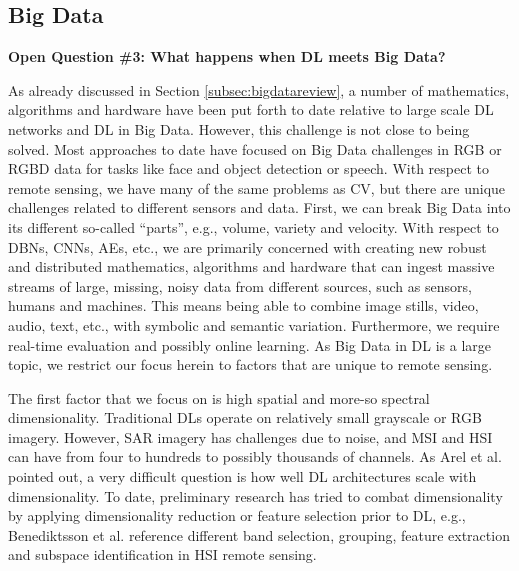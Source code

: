 \documentclass[12pt]{spieman}
\begin{document}
\begin{spacing}{1}
%
%
\subsection{Big Data}
\label{subsec:ChallengesOpportunities_iii}
\textbf{Open Question \#3: What happens when DL meets Big Data?}

As already discussed in Section \ref{subsec:bigdatareview}, a number of mathematics, algorithms and hardware have been put forth to date relative to large scale DL networks and DL in Big Data. However, this challenge is not close to being solved. Most approaches to date have focused on Big Data challenges in RGB or RGBD data for tasks like face and object detection or speech. With respect to remote sensing, we have many of the same problems as CV, but there are unique challenges related to different sensors and data. First, we can break Big Data into its different so-called ``parts'', e.g., volume, variety and velocity. With respect to DBNs, CNNs, AEs, etc., we are primarily concerned with creating new robust and distributed mathematics, algorithms and hardware that can ingest massive streams of large, missing, noisy data from different sources, such as sensors, humans and machines. This means being able to combine image stills, video, audio, text, etc., with symbolic and semantic variation. Furthermore, we require real-time evaluation and possibly online learning. As Big Data in DL is a large topic, we restrict our focus herein to factors that are unique to remote sensing.

The first factor that we focus on is high spatial and more-so spectral dimensionality. Traditional DLs operate on relatively small grayscale or RGB imagery. However, SAR imagery has challenges due to noise, and MSI and HSI can have from four to hundreds to possibly thousands of channels. As Arel et al. \cite{Arel2010} pointed out, a very difficult question is how well DL architectures scale with dimensionality. To date, preliminary research has tried to combat dimensionality by applying dimensionality reduction or feature selection prior to DL, e.g., Benediktsson et al. \cite{Benediktsson2012} reference different band selection, grouping, feature extraction and subspace identification in HSI remote sensing.


\end{spacing}
\end{document}
